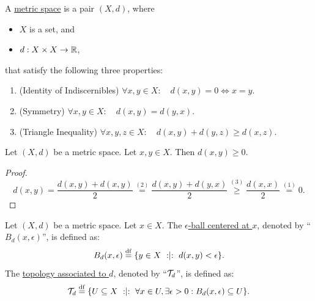\documentclass[11pt,reqno]{amsart}
\begin{document}
\begin{Def}
A \ul{metric space} is a pair $(X,d)$, where
\begin{itemize}
\item $X$ is a set, and
\item $d:X\times X\to\mathbb{R}$,
\end{itemize}
that satisfy the following three properties:
\begin{enumerate}
\item (Identity of Indiscernibles)
$\forall x,y\in X:\quad d(x,y)=0\iff x=y$.
\item (Symmetry)
$\forall x,y\in X:\quad d(x,y)=d(y,x)$.
\item (Triangle Inequality)
$\forall x,y,z\in X:\quad
d(x,y)+d(y,z)\ge d(x,z)$.
\end{enumerate}
\end{Def}
\begin{lemma}\label{lem:metric-nonneg}
Let $(X,d)$ be a metric space. Let $x,y\in X$. Then $d(x,y)\ge 0$.
\end{lemma}
\begin{proof}
\[
d(x,y)=\frac{d(x,y)+d(x,y)}2\stackrel{(2)}{=}
\frac{d(x,y)+d(y,x)}2
\stackrel{(3)}{\ge}\frac{d(x,x)}2
\stackrel{(1)}{=}
0.
\]
\end{proof}

\begin{Def}
Let $(X,d)$ be a metric space.
Let $x\in X$.
The \ul{$\epsilon$-ball centered at $x$},
denoted by ``$B_d(x,\epsilon)$'', is defined as:
\[B_d(x,\epsilon)\df\set{y\in X\st d(x,y)<\epsilon}.\]
The \ul{topology associated to $d$}, denoted by ``$\mathcal{T}_d$'', is defined as:
\[\T_d\df\set{U\subseteq X\st\forall x\in U,\exists\epsilon>0:
B_d(x,\epsilon)\subseteq U
}.
\]
\end{Def}
\end{document}

